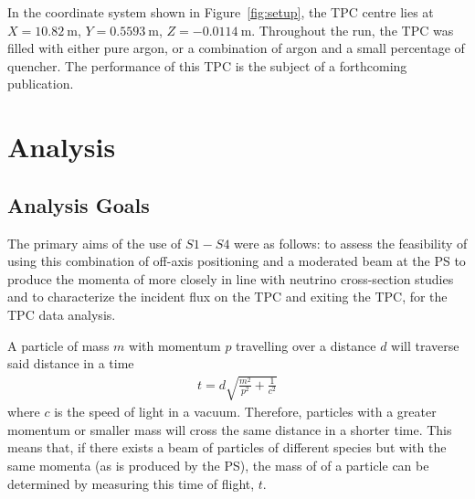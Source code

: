 In the coordinate system shown in Figure~\ref{fig:setup}, the TPC centre lies at $X=10.82~\text{m}$, $Y=0.5593~\text{m}$, $Z=-0.0114~\text{m}$. 
Throughout the run, the TPC was filled with either pure argon, or a combination of argon and a small percentage of quencher. 
The performance of this TPC is the subject of a forthcoming publication.

\section{Analysis}
\label{hptpcPaper:sec:Analysis}
\subsection{Analysis Goals}

The primary aims of the use of $\mathit{S1} - \mathit{S4}$ were as follows: to assess the feasibility of using this combination of off-axis positioning and a moderated beam at the PS to produce the momenta of more closely in line with neutrino cross-section studies and to characterize the incident flux on the TPC and exiting the TPC, for the TPC data analysis. 


A particle of mass $m$ with momentum $p$ travelling over a distance $d$ will traverse said distance in a time
\begin{align}
	t = d \sqrt{\frac{m^2}{p^2} + \frac{1}{c^2}}
\end{align}
where $c$ is the speed of light in a vacuum.
Therefore, particles with a greater momentum or smaller mass will cross the same distance in a shorter time.
This means that, if there exists a beam of particles of different species but with the same momenta (as is produced by the PS), the mass of of a particle can be determined by measuring this time of flight, $t$.

